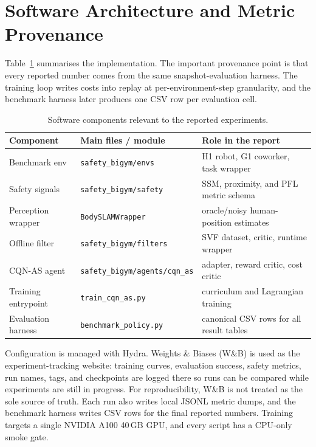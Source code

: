 \documentclass[11pt,a4paper]{report}
\newcommand{\ssm}{SSM}
\newcommand{\pfl}{PFL}
\newcommand{\cqnas}{CQN-AS}
\begin{document}

\section{Software Architecture and Metric Provenance}
\label{sec:impl:arch}
\label{sec:impl:metrics}

Table~\ref{tab:software-architecture} summarises the implementation.
The important provenance point is that every reported number comes from
the same snapshot-evaluation harness. The training loop writes costs
into replay at per-environment-step granularity, and the benchmark
harness later produces one CSV row per evaluation cell.

\begin{table}[htbp]
\centering
\small
\caption{Software components relevant to the reported experiments.}
\label{tab:software-architecture}
\begin{tabular}{lll}
\toprule
Component & Main files / module & Role in the report \\
\midrule
Benchmark env & \texttt{safety\_bigym/envs} & H1 robot, G1 coworker, task wrapper \\
Safety signals & \texttt{safety\_bigym/safety} & \ssm{}, proximity, and \pfl{} metric schema \\
Perception wrapper & \texttt{BodySLAMWrapper} & oracle/noisy human-position estimates \\
Offline filter & \texttt{safety\_bigym/filters} & SVF dataset, critic, runtime wrapper \\
\cqnas{} agent & \texttt{safety\_bigym/agents/cqn\_as} & adapter, reward critic, cost critic \\
Training entrypoint & \texttt{train\_cqn\_as.py} & curriculum and Lagrangian training \\
Evaluation harness & \texttt{benchmark\_policy.py} & canonical CSV rows for all result tables \\
\bottomrule
\end{tabular}
\end{table}

Configuration is managed with Hydra. Weights \& Biases (W\&B) is used
as the experiment-tracking website: training curves, evaluation
success, safety metrics, run names, tags, and checkpoints are logged
there so runs can be compared while experiments are still in progress.
For reproducibility, W\&B is not treated as the sole source of truth.
Each run also writes local JSONL metric dumps, and the benchmark
harness writes CSV rows for the final reported numbers. Training
targets a single NVIDIA A100 40\,GB GPU, and every script has a
CPU-only smoke gate.
\end{document}
